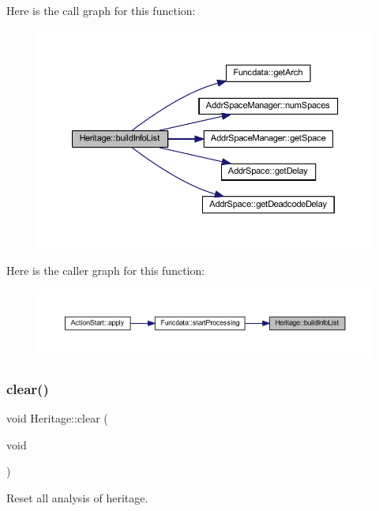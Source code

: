 Here is the call graph for this function\+:
\nopagebreak
\begin{figure}[H]
\begin{center}
\leavevmode
\includegraphics[width=350pt]{class_heritage_a7cca3fa6fe1e5d6241ca3e0f0a29af42_cgraph}
\end{center}
\end{figure}
Here is the caller graph for this function\+:
\nopagebreak
\begin{figure}[H]
\begin{center}
\leavevmode
\includegraphics[width=350pt]{class_heritage_a7cca3fa6fe1e5d6241ca3e0f0a29af42_icgraph}
\end{center}
\end{figure}
\mbox{\label{class_heritage_a7cdea4058aa42f91bbdb5a9b3171950f}} 
\subsubsection{\texorpdfstring{clear()}{clear()}}
{\footnotesize\ttfamily void Heritage\+::clear (\begin{DoxyParamCaption}\item[{void}]{ }\end{DoxyParamCaption})}



Reset all analysis of heritage. 

